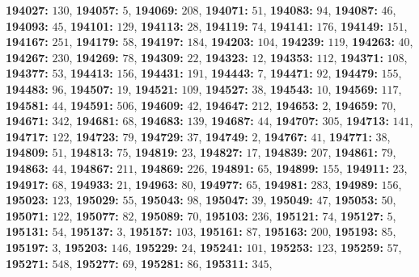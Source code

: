 \textsf{\bfseries 194027:} $130$, \textsf{\bfseries 194057:} $5$, \textsf{\bfseries 194069:} $208$, \textsf{\bfseries 194071:} $51$, \textsf{\bfseries 194083:} $94$, \textsf{\bfseries 194087:} $46$, \textsf{\bfseries 194093:} $45$, \textsf{\bfseries 194101:} $129$, \textsf{\bfseries 194113:} $28$, \textsf{\bfseries 194119:} $74$, \textsf{\bfseries 194141:} $176$, \textsf{\bfseries 194149:} $151$, \textsf{\bfseries 194167:} $251$, \textsf{\bfseries 194179:} $58$, \textsf{\bfseries 194197:} $184$, \textsf{\bfseries 194203:} $104$, \textsf{\bfseries 194239:} $119$, \textsf{\bfseries 194263:} $40$, \textsf{\bfseries 194267:} $230$, \textsf{\bfseries 194269:} $78$, \textsf{\bfseries 194309:} $22$, \textsf{\bfseries 194323:} $12$, \textsf{\bfseries 194353:} $112$, \textsf{\bfseries 194371:} $108$, \textsf{\bfseries 194377:} $53$, \textsf{\bfseries 194413:} $156$, \textsf{\bfseries 194431:} $191$, \textsf{\bfseries 194443:} $7$, \textsf{\bfseries 194471:} $92$, \textsf{\bfseries 194479:} $155$, \textsf{\bfseries 194483:} $96$, \textsf{\bfseries 194507:} $19$, \textsf{\bfseries 194521:} $109$, \textsf{\bfseries 194527:} $38$, \textsf{\bfseries 194543:} $10$, \textsf{\bfseries 194569:} $117$, \textsf{\bfseries 194581:} $44$, \textsf{\bfseries 194591:} $506$, \textsf{\bfseries 194609:} $42$, \textsf{\bfseries 194647:} $212$, \textsf{\bfseries 194653:} $2$, \textsf{\bfseries 194659:} $70$, \textsf{\bfseries 194671:} $342$, \textsf{\bfseries 194681:} $68$, \textsf{\bfseries 194683:} $139$, \textsf{\bfseries 194687:} $44$, \textsf{\bfseries 194707:} $305$, \textsf{\bfseries 194713:} $141$, \textsf{\bfseries 194717:} $122$, \textsf{\bfseries 194723:} $79$, \textsf{\bfseries 194729:} $37$, \textsf{\bfseries 194749:} $2$, \textsf{\bfseries 194767:} $41$, \textsf{\bfseries 194771:} $38$, \textsf{\bfseries 194809:} $51$, \textsf{\bfseries 194813:} $75$, \textsf{\bfseries 194819:} $23$, \textsf{\bfseries 194827:} $17$, \textsf{\bfseries 194839:} $207$, \textsf{\bfseries 194861:} $79$, \textsf{\bfseries 194863:} $44$, \textsf{\bfseries 194867:} $211$, \textsf{\bfseries 194869:} $226$, \textsf{\bfseries 194891:} $65$, \textsf{\bfseries 194899:} $155$, \textsf{\bfseries 194911:} $23$, \textsf{\bfseries 194917:} $68$, \textsf{\bfseries 194933:} $21$, \textsf{\bfseries 194963:} $80$, \textsf{\bfseries 194977:} $65$, \textsf{\bfseries 194981:} $283$, \textsf{\bfseries 194989:} $156$, \textsf{\bfseries 195023:} $123$, \textsf{\bfseries 195029:} $55$, \textsf{\bfseries 195043:} $98$, \textsf{\bfseries 195047:} $39$, \textsf{\bfseries 195049:} $47$, \textsf{\bfseries 195053:} $50$, \textsf{\bfseries 195071:} $122$, \textsf{\bfseries 195077:} $82$, \textsf{\bfseries 195089:} $70$, \textsf{\bfseries 195103:} $236$, \textsf{\bfseries 195121:} $74$, \textsf{\bfseries 195127:} $5$, \textsf{\bfseries 195131:} $54$, \textsf{\bfseries 195137:} $3$, \textsf{\bfseries 195157:} $103$, \textsf{\bfseries 195161:} $87$, \textsf{\bfseries 195163:} $200$, \textsf{\bfseries 195193:} $85$, \textsf{\bfseries 195197:} $3$, \textsf{\bfseries 195203:} $146$, \textsf{\bfseries 195229:} $24$, \textsf{\bfseries 195241:} $101$, \textsf{\bfseries 195253:} $123$, \textsf{\bfseries 195259:} $57$, \textsf{\bfseries 195271:} $548$, \textsf{\bfseries 195277:} $69$, \textsf{\bfseries 195281:} $86$, \textsf{\bfseries 195311:} $345$, 

